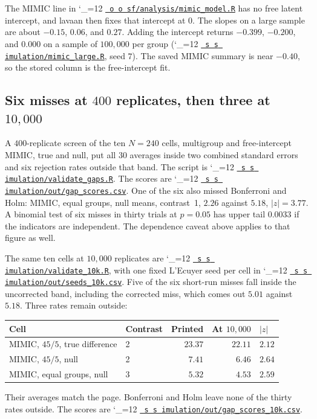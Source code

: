 \documentclass[11pt]{article}
\makeatletter
\newcommand{\proofbase}{https://github.com/alectionary/vibe-math/blob/master/formalization/latent-contrasts}
\def\latent@show#1{%
  \ifx\relax#1\else
    #1\allowbreak
    \expandafter\latent@show
  \fi}
\newcommand{\src}{\begingroup\catcode`\_=12 \latent@src}
\newcommand{\latent@src}[1]{%
  \edef\srcurl{\proofbase/#1}%
  \href{\srcurl}{\texttt{\latent@show#1\relax}}\endgroup}
\newcommand{\srcat}{\begingroup\catcode`\_=12 \latent@srcat}
\newcommand{\latent@srcat}[2]{%
  \edef\srcurl{\proofbase/#1\#L#2}%
  \href{\srcurl}{\texttt{\latent@show#1\relax}}\endgroup}
\makeatother
\begin{document}
The MIMIC line in \srcat{osf/analysis/mimic_model.R}{7} has no free latent
intercept, and lavaan then fixes that intercept at \(0\). The slopes on
a large sample are about \(-0.15\), \(0.06\), and \(0.27\). Adding the
intercept returns \(-0.399\), \(-0.200\), and \(0.000\) on a sample of
\(100{,}000\) per group (\srcat{simulation/mimic_large.R}{10}, seed \(7\)).
The saved MIMIC summary is near \(-0.40\), so the stored column is the
free-intercept fit.

\subsection{Six misses at \(400\) replicates, then three at \(10{,}000\)}

A \(400\)-replicate screen of the ten \(N=240\) cells, multigroup and
free-intercept MIMIC, true and null, put all \(30\) averages inside two
combined standard errors and six rejection rates outside that band.
The script is \srcat{simulation/validate_gaps.R}{122}. The scores are
\src{simulation/out/gap_scores.csv}. One of the six also missed
Bonferroni and Holm: MIMIC, equal groups, null means, contrast~1,
\(2.26\) against \(5.18\), \(|z|=3.77\). A binomial test of six misses
in thirty trials at \(p=0.05\) has upper tail \(0.0033\) if the
indicators are independent. The dependence caveat above applies to that
figure as well.

The same ten cells at \(10{,}000\) replicates are
\srcat{simulation/validate_10k.R}{126}, with one fixed L'Ecuyer seed per cell
in \src{simulation/out/seeds_10k.csv}. Five of the six short-run misses
fall inside the uncorrected band, including the corrected miss, which
comes out \(5.01\) against \(5.18\). Three rates remain outside:

\begin{center}
\footnotesize
\begin{tabular}{@{}llrrl@{}}
\toprule
Cell & Contrast & Printed & At \(10{,}000\) & \(|z|\) \\
\midrule
MIMIC, \(45/5\), true difference & 2 & \(23.37\) & \(22.11\) & \(2.12\) \\
MIMIC, \(45/5\), null & 2 & \(7.41\) & \(6.46\) & \(2.64\) \\
MIMIC, equal groups, null & 3 & \(5.32\) & \(4.53\) & \(2.59\) \\
\bottomrule
\end{tabular}
\end{center}

Their averages match the page. Bonferroni and Holm leave none of the
thirty rates outside. The scores are
\src{simulation/out/gap_scores_10k.csv}.
\end{document}

